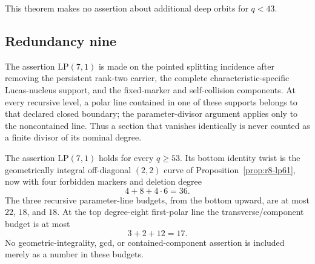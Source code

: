 This theorem makes no assertion about additional deep orbits for
$q<43$.

\subsection{Redundancy nine}

\begin{definition}\label{def:r9-pointed-domain}
The assertion $\mathrm{LP}(7,1)$ is made on the pointed splitting
incidence after removing the persistent rank-two carrier, the complete
characteristic-specific Lucas-nucleus support, and the fixed-marker and
self-collision components.  At every recursive level, a polar line
contained in one of these supports belongs to that declared closed
boundary; the parameter-divisor argument applies only to the
noncontained line.  Thus a section that vanishes identically is never
counted as a finite divisor of its nominal degree.
\end{definition}

\begin{proposition}
\label{prop:r9-budgets}%
%
The assertion $\mathrm{LP}(7,1)$ holds for every $q\geq53$.
Its bottom identity twist is the geometrically integral off-diagonal
$(2,2)$ curve of Proposition~\ref{prop:r8-lp61}, now with four
forbidden markers and deletion degree
\begin{equation}\label{eq:r9-deletion}
       4+8+4\cdot6=36.
\end{equation}
The three recursive parameter-line budgets, from the bottom upward,
are at most $22$, $18$, and $18$.  At the top degree-eight
first-polar line the transverse/component budget is at most
\begin{equation}\label{eq:r9-top-budget}
       3+2+12=17.
\end{equation}
No geometric-integrality, gcd, or contained-component assertion is
included merely as a number in these budgets.
\end{proposition}

